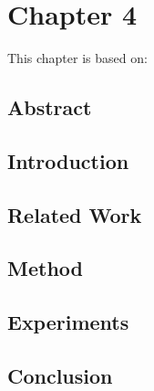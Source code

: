 \cleardoublepage
\chapter{Chapter 4}

\label{ch:4}

\newpage
This chapter is based on: 

\section*{Abstract}

\section{Introduction}

\section{Related Work}

\section{Method}

\section{Experiments}

\section{Conclusion}